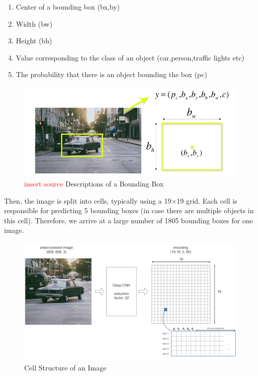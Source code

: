 \documentclass[a4paper]{article}
\begin{document}
\begin{enumerate}
    \item Center of a bounding box (bx,by)
    \item Width (bw)
    \item Height (bh)
    \item Value corresponding to the class of an object (car,person,traffic lights etc)
    \item The probability that there is an object bounding the box (pc)
\end{enumerate}

\begin{figure}[h!]
    \centering
    \includegraphics[width=\linewidth]{Pictures/yoloWorks1.png}
    \caption{\textcolor{red}{insert source} Descriptions of a Bounding Box}
    \label{fig2:descriptionOfBBox}
\end{figure}

Then, the image is split into cells, typically using a 19×19 grid. Each cell is responsible for predicting 5 bounding boxes (in case there are multiple objects in this cell). Therefore, we arrive at a large number of 1805 bounding boxes for one image.

\begin{figure}[h!]
    \centering
    \includegraphics[width=\linewidth]{Pictures/yoloWorks2.png}
    \caption{Cell Structure of an Image}
    \label{fig3:StructImg}
\end{figure}
\end{document}

